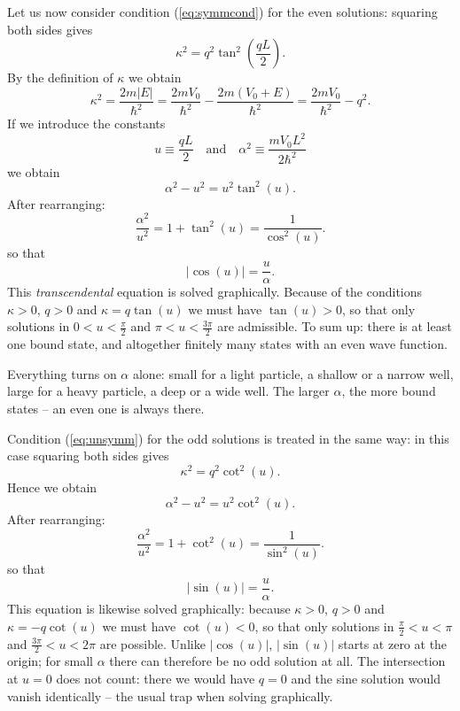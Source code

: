 Let us now consider condition (\ref{eq:symmcond}) for the even solutions: squaring both sides gives
\begin{equation}
	\kappa^2 = q^2\tan^2\left(\frac{qL}{2}\right).
\end{equation}
By the definition of $\kappa$ we obtain
\begin{equation}
	\kappa^2 = \frac{2m|E|}{\hbar^2} = \frac{2mV_0}{\hbar^2} - \frac{2m(V_0+E)}{\hbar^2} = \frac{2mV_0}{\hbar^2} - q^2.
\end{equation}
If we introduce the constants
\begin{equation}
	u\equiv \frac{qL}{2}\quad \text{and}\quad \alpha^2 \equiv \frac{m V_0 L^2}{2\hbar^2}
\end{equation}
we obtain
\begin{equation}
	\alpha^2-u^2 = u^2\tan^2(u).
\end{equation}
After rearranging:
\begin{equation}
	\frac{\alpha^2}{u^2} = 1+\tan^2(u) = \frac{1}{\cos^2(u)}.
\end{equation}
so that
\begin{equation}
	|\cos(u)| = \frac{u}{\alpha}.
\end{equation}
This \emph{transcendental} equation is solved graphically. Because of the conditions $\kappa>0$, $q>0$ and $\kappa = q\tan(u)$ we must have $\tan(u)>0$, so that only solutions in $0<u<\frac{\pi}{2}$ and $\pi < u < \frac{3\pi}{2}$ are admissible. To sum up: there is at least one bound state, and altogether finitely many states with an even wave function.

\begin{merksatz}
	Everything turns on $\alpha$ alone: small for a light particle, a shallow or a narrow well, large for a heavy particle, a deep or a wide well. The larger $\alpha$, the more bound states -- an even one is always there.
\end{merksatz}


Condition (\ref{eq:unsymm}) for the odd solutions is treated in the same way: in this case squaring both sides gives
\begin{equation}
	\kappa^2 = q^2\cot^2\left(u\right).
\end{equation}
Hence we obtain
\begin{equation}
	\alpha^2-u^2 = u^2\cot^2(u).
\end{equation}
After rearranging:
\begin{equation}
	\frac{\alpha^2}{u^2} = 1+\cot^2(u) = \frac{1}{\sin^2(u)}.
\end{equation}
so that
\begin{equation}
	|\sin(u)| = \frac{u}{\alpha}.
\end{equation}
This equation is likewise solved graphically: because $\kappa>0$, $q>0$ and $\kappa = -q\cot(u)$ we must have $\cot(u)<0$, so that only solutions in $\frac{\pi}{2}<u< \pi$ and $\frac{3\pi}{2} < u < 2\pi$ are possible. Unlike $|\cos(u)|$, $|\sin(u)|$ starts at zero at the origin; for small $\alpha$ there can therefore be no odd solution at all. The intersection at $u=0$ does not count: there we would have $q=0$ and the sine solution would vanish identically -- the usual trap when solving graphically.

